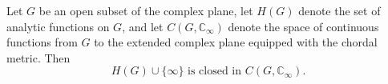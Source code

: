 Let $G$ be an open subset of the complex plane, let $H(G)$ denote the set of analytic functions on $G$, and let $C(G, \mathbb{C}_\infty)$ denote the space of continuous functions from $G$ to the extended complex plane equipped with the chordal metric. Then
$$H(G) \cup \{\infty\} \text{ is closed in } C(G, \mathbb{C}_\infty).$$

